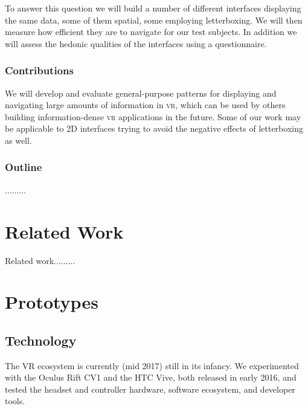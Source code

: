 \documentclass{tufte-book} %
\begin{document}
To answer this question we will build a number of different interfaces displaying the same data, some of them spatial, some employing letterboxing. We will then measure how efficient they are to navigate for our test subjects. In addition we will assess the hedonic qualities of the interfaces using a questionnaire.

\subsection{Contributions}
We will develop and evaluate general-purpose patterns for displaying and navigating large amounts of information in \textsc{vr}, which can be used by others building information-dense \textsc{vr} applications in the future. Some of our work may be applicable to 2D interfaces trying to avoid the negative effects of letterboxing as well.

\subsection{Outline}

.........



\chapter{Related Work}
\label{ch:related-work}

Related work.........



\chapter{Prototypes}
\label{ch:prototypes}

\section{Technology}
The \textsc{VR} ecosystem is currently (mid 2017) still in its infancy. We experimented with the Oculus Rift \textsc{CV1} and the \textsc{HTC} Vive, both released in early 2016, and tested the headset and controller hardware, software ecosystem, and developer tools.
\end{document}
